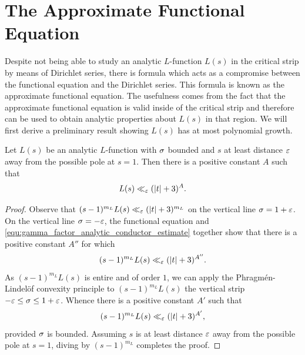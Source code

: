  \section{The Approximate Functional Equation}
    Despite not being able to study an analytic \(L\)-function \(L(s)\) in the critical strip by means of Dirichlet series, there is formula which acts as a compromise between the functional equation and the Dirichlet series. This formula is known as the approximate functional equation. The usefulness comes from the fact that the approximate functional equation is valid inside of the critical strip and therefore can be used to obtain analytic properties about \(L(s)\) in that region. We will first derive a preliminary result showing \(L(s)\) has at most polynomial growth.

    \begin{proposition}\label{prop:L_function_bounded_in_vertical_strips}
      Let \(L(s)\) be an analytic \(L\)-function with \(\sigma\) bounded and \(s\) at least distance \(\varepsilon\) away from the possible pole at \(s = 1\). Then there is a positive constant \(A\) such that
      \[
        L(s) \ll_{\varepsilon} (|t|+3)^{A}.
      \]
    \end{proposition}
    \begin{proof}
      Observe that \((s-1)^{m_{L}}L(s) \ll_{\varepsilon} (|t|+3)^{m_{L}}\) on the vertical line \(\sigma = 1+\varepsilon\). On the vertical line \(\sigma = -\varepsilon\), the functional equation and \cref{equ:gamma_factor_analytic_conductor_estimate} together show that there is a positive constant \(A''\) for which
      \[
        (s-1)^{m_{L}}L(s) \ll_{\varepsilon} (|t|+3)^{A''}.
      \]
      As \((s-1)^{m_{L}}L(s)\) is entire and of order \(1\), we can apply the Phragm\'en-Lindel\"of convexity principle to \((s-1)^{m_{L}}L(s)\) the vertical strip \(-\varepsilon \le \sigma \le 1+\varepsilon\). Whence there is a positive constant \(A'\) such that
      \[
        (s-1)^{m_{L}}L(s) \ll_{\varepsilon} (|t|+3)^{A'},
      \]
      provided \(\sigma\) is bounded. Assuming \(s\) is at least distance \(\varepsilon\) away from the possible pole at \(s = 1\), diving by \((s-1)^{m_{L}}\) completes the proof.
    \end{proof}

